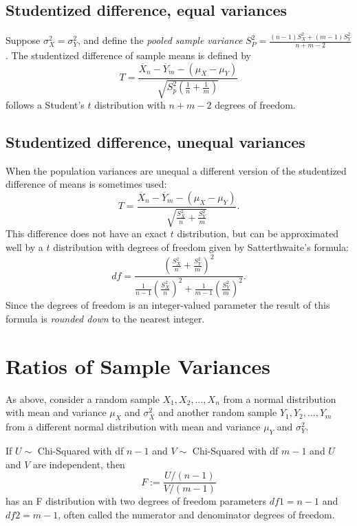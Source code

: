 \documentclass[
]{book}
\begin{document}
\hypertarget{studentized-difference-equal-variances}{%
\subsection{Studentized difference, equal variances}\label{studentized-difference-equal-variances}}

Suppose \(\sigma_X^2 = \sigma_Y^2\), and define the \emph{pooled sample variance} \(S_P^2 = \frac{(n-1)S_X^2 + (m-1)S_Y^2}{n+m-2}\). The studentized difference of sample means is defined by
\[T = \frac{\overline X_n - \overline Y_m - (\mu_X - \mu_Y)}{\sqrt{S_p^2(\frac{1}{n}+\frac{1}{m})}}\]
follows a Student's \(t\) distribution with \(n+m - 2\) degrees of freedom.

\hypertarget{studentized-difference-unequal-variances}{%
\subsection{Studentized difference, unequal variances}\label{studentized-difference-unequal-variances}}

When the population variances are unequal a different version of the studentized difference of means is sometimes used:
\[T = \frac{\overline X_n - \overline Y_m - (\mu_X - \mu_Y)}{\sqrt{\frac{S_X^2}{n}+\frac{S_Y^2}{m}}}.\]
This difference does not have an exact \(t\) distribution, but can be approximated well by a \(t\) distribution with degrees of freedom given by Satterthwaite's formula:
\[df = \frac{\left(\frac{S_X^2}{n}+\frac{S_Y^2}{m}\right)^2}{\frac{1}{n-1}\left(\frac{S_X^2}{n}\right)^2 + \frac{1}{m-1}\left(\frac{S_Y^2}{m}\right)^2}.\]
Since the degrees of freedom is an integer-valued parameter the result of this formula is \emph{rounded down} to the nearest integer.

\hypertarget{ratios-of-sample-variances}{%
\section{Ratios of Sample Variances}\label{ratios-of-sample-variances}}

As above, consider a random sample \(X_1, X_2, \ldots, X_{n}\) from a normal distribution with mean and variance \(\mu_X\) and \(\sigma_X^2\) and another random sample \(Y_1, Y_2, \ldots, Y_m\) from a different normal distribution with mean and variance \(\mu_Y\) and \(\sigma_Y^2\).

If \(U\sim\) Chi-Squared with df \(n-1\) and \(V\sim\) Chi-Squared with df \(m-1\) and \(U\) and \(V\) are independent, then
\[F := \frac{U/(n-1)}{V/(m-1)}\]
has an F distribution with two degrees of freedom parameters \(df1 = n-1\) and \(df2 = m-1\), often called the numerator and denominator degrees of freedom.
\end{document}
